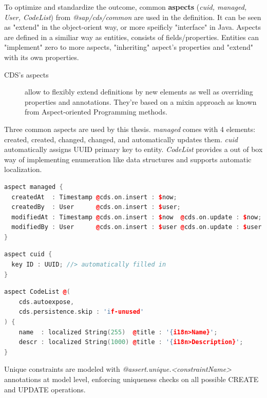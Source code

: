 To optimize and standardize the outcome, common \textbf{aspects} (\textit{cuid, managed, User, CodeList}) from \textit{@sap/cds/common} are used in the definition. It can be seen as "extend" in the object-orient way, or more speificly "interface" in Java. Aspects are defined in a similiar way as entities, consists of fields/properties. Entities can "implement" zero to more aspects, "inheriting" aspect's properties and "extend" with its own properties. 

\begin{description}
    \item[CDS's aspects] allow to flexibly extend definitions by new elements as well as overriding properties and annotations. They're based on a mixin approach as known from Aspect-oriented Programming methods.
\end{description}

Three common aspects are used by this thesis. \textit{managed} comes with 4 elements: created, created, changed, changed, and automatically updates them. \textit{cuid} automatically assigns UUID primary key to entity. \textit{CodeList} provides a out of box way of implementing enumeration like data structures and supports automatic localization.

\begin{lstlisting}[language={c++}]
aspect managed {
  createdAt  : Timestamp @cds.on.insert : $now;
  createdBy  : User      @cds.on.insert : $user;
  modifiedAt : Timestamp @cds.on.insert : $now  @cds.on.update : $now;
  modifiedBy : User      @cds.on.insert : $user @cds.on.update : $user;
}
\end{lstlisting}

\begin{lstlisting}[language={c++}]
aspect cuid {
  key ID : UUID; //> automatically filled in
}
\end{lstlisting}

\begin{lstlisting}[language={c++}]
aspect CodeList @(
    cds.autoexpose,
    cds.persistence.skip : 'if-unused'
) {
    name  : localized String(255)  @title : '{i18n>Name}';
    descr : localized String(1000) @title : '{i18n>Description}';
}
\end{lstlisting}

Unique constraints are modeled with \textit{@assert.unique.<constraintName>} annotations at model level, enforcing uniqueness checks on all possible CREATE and UPDATE operations.

